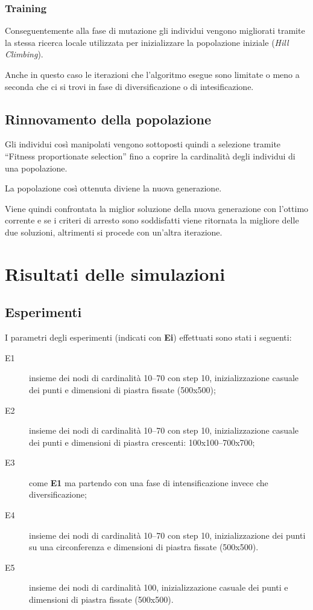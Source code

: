 \documentclass[a4paper]{article}
\begin{document}
            \subsubsection{Training}
                Conseguentemente alla fase di mutazione gli individui vengono migliorati tramite la stessa ricerca locale utilizzata per inizializzare
                la popolazione iniziale (\emph{Hill Climbing}).

                Anche in questo caso le iterazioni che l'algoritmo esegue sono limitate o meno a seconda che ci si trovi in fase di diversificazione o di intesificazione.

        \subsection{Rinnovamento della popolazione}
            Gli individui cos\`i manipolati vengono sottoposti quindi a selezione tramite ``Fitness proportionate selection'' fino a coprire la
            cardinalit\`a degli individui di una popolazione.

            La popolazione cos\`i ottenuta diviene la nuova generazione.
            
            Viene quindi confrontata la miglior soluzione della nuova generazione con l'ottimo corrente e se i criteri di arresto sono soddisfatti viene ritornata la migliore delle due soluzioni,
            altrimenti si procede con un'altra iterazione.
\newpage
    \section{Risultati delle simulazioni}
        
        \subsection{Esperimenti}
        I parametri degli esperimenti (indicati con \textbf{Ei}) effettuati sono stati i seguenti:
        \begin{description}
            \item[E1] insieme dei nodi di cardinalit\`a 10--70 con step 10, inizializzazione casuale dei punti e dimensioni di piastra fissate (500x500);
            \item[E2] insieme dei nodi di cardinalit\`a 10--70 con step 10, inizializzazione casuale dei punti e dimensioni di piastra crescenti: 100x100--700x700;
            \item[E3] come \textbf{E1} ma partendo con una fase di intensificazione invece che diversificazione;
            \item[E4] insieme dei nodi di cardinalit\`a 10--70 con step 10, inizializzazione dei punti su una circonferenza e dimensioni di piastra fissate (500x500).
            \item[E5] insieme dei nodi di cardinalit\`a 100, inizializzazione casuale dei punti e dimensioni di piastra fissate (500x500).
        \end{description}
\end{document}
